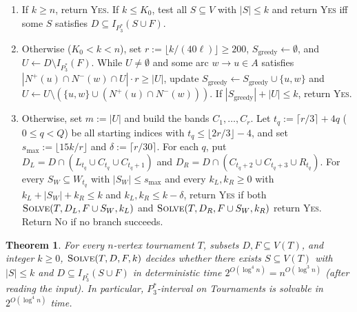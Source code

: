 \documentclass[11pt]{article}
\newtheorem{theorem}{Theorem}[section]
\theoremstyle{remark}
\begin{document}
\begin{enumerate}
  \item If $k \ge n$, return \textsc{Yes}. If $k \le K_0$, test all $S \subseteq V$ with $|S| \le k$ and return \textsc{Yes} iff some $S$ satisfies $D \subseteq I_{P_3^*}(S \cup F)$.
  \item Otherwise ($K_0 < k < n$), set $r := \lfloor k / (40 \ell) \rfloor \ge 200$, $S_{\mathrm{greedy}} \leftarrow \emptyset$, and $U \leftarrow D \setminus I_{P_3^*}(F)$. While $U \ne \emptyset$ and some arc $w \to u \in A$ satisfies $|N^+(u) \cap N^-(w) \cap U| \cdot r \ge |U|$, update $S_{\mathrm{greedy}} \leftarrow S_{\mathrm{greedy}} \cup \{u, w\}$ and $U \leftarrow U \setminus (\{u, w\} \cup (N^+(u) \cap N^-(w)))$. If $|S_{\mathrm{greedy}}| + |U| \le k$, return \textsc{Yes}.
  \item Otherwise, set $m := |U|$ and build the bands $C_1, \dots, C_r$. Let $t_q := \lceil r/3 \rceil + 4q$ ($0 \le q < Q$) be all starting indices with $t_q \le \lfloor 2r/3 \rfloor - 4$, and set $s_{\max} := \lfloor 15k/r \rfloor$ and $\delta := \lceil r/30 \rceil$. For each $q$, put $D_L = D \cap (L_{t_q} \cup C_{t_q} \cup C_{t_q+1})$ and $D_R = D \cap (C_{t_q+2} \cup C_{t_q+3} \cup R_{t_q})$. For every $S_W \subseteq W_{t_q}$ with $|S_W| \le s_{\max}$ and every $k_L, k_R \ge 0$ with $k_L + |S_W| + k_R \le k$ and $k_L, k_R \le k - \delta$, return \textsc{Yes} if both $\textsc{Solve}(T, D_L, F \cup S_W, k_L)$ and $\textsc{Solve}(T, D_R, F \cup S_W, k_R)$ return \textsc{Yes}. Return \textsc{No} if no branch succeeds.
\end{enumerate}

\begin{theorem}\label{thm:qp}
For every $n$-vertex tournament $T$, subsets $D, F \subseteq V(T)$, and integer $k \ge 0$, $\textsc{Solve}(T, D, F, k)$ decides whether there exists $S \subseteq V(T)$ with $|S| \le k$ and $D \subseteq I_{P_3^*}(S \cup F)$ in deterministic time $2^{O(\log^4 n)} = n^{O(\log^3 n)}$ (after reading the input). In particular, \emph{$P_3^*$-interval on Tournaments} is solvable in $2^{O(\log^4 n)}$ time.
\end{theorem}
\end{document}
